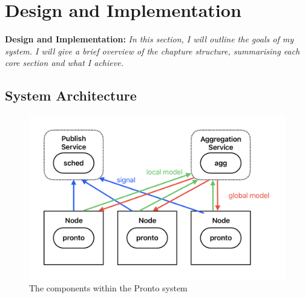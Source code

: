 \chapter{Design and Implementation}
\begin{tcolorbox}[boxsep=0mm,left=2.5mm,right=2.5mm]
    \textbf{Design and Implementation:} {\em In this section, I will outline the
    goals of my system. I will give a brief overview of the chapture structure,
    summarising each core section and what I achieve.}
\end{tcolorbox}

\section{System Architecture}
\begin{figure}[h]
    \centering
    \includegraphics[width=\textwidth]{images/system.pdf}
    \caption{The components within the Pronto system}
    \label{pronto-system}
\end{figure}

